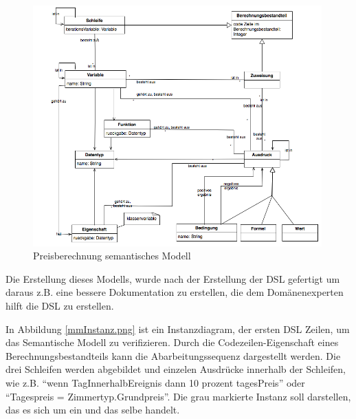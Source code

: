 \documentclass[11pt,english,ngerman, headsepline]{scrreprt}
\begin{document}
\begin{figure}[h!]
	\begin{center}
	\includegraphics[width=0.99\textwidth]{pics/mm}
	\end{center}
	\caption{Preisberechnung semantisches Modell}
	\label{mm.png}
\end{figure}

Die Erstellung dieses Modells, wurde nach der Erstellung der DSL gefertigt um
daraus z.B. eine bessere Dokumentation zu erstellen, die dem Domänenexperten
hilft die DSL zu erstellen.
  
In Abbildung \ref{mmInstanz.png} ist ein Instanzdiagram, der ersten DSL
Zeilen, um das Semantische Modell zu verifizieren.
Durch die Codezeilen-Eigenschaft eines Berechnungsbestandteils kann die
Abarbeitungssequenz dargestellt werden. Die drei Schleifen werden abgebildet und
einzelen Ausdrücke innerhalb der Schleifen, wie z.B. ``wenn TagInnerhalbEreignis
dann 10 prozent tagesPreis'' oder ``Tagespreis = Zimmertyp.Grundpreis''. Die
grau markierte Instanz soll darstellen, das es sich um ein und das selbe
handelt. 
\end{document}
